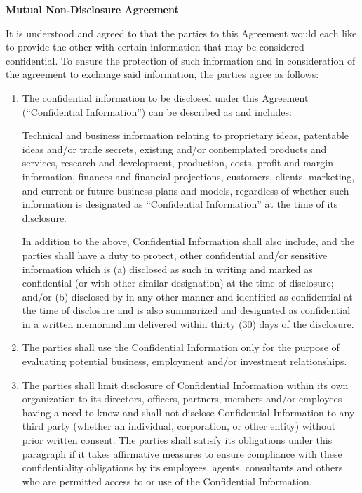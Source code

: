 \documentclass[a4paper, 11pt, twoside]{article}
\begin{document}
\begin{center}
\bf{Mutual Non-Disclosure Agreement}
\end{center}

It is understood and agreed to that the parties to this Agreement would each like to provide the other with certain information that may be considered confidential. To ensure the protection of such information and in consideration of the agreement to exchange said information, the parties agree as follows:

\begin{enumerate}

\item The confidential information to be disclosed under this Agreement (``Confidential Information'') can be described as and includes:

Technical and business information relating to proprietary ideas, patentable ideas and/or trade secrets, existing and/or contemplated products and services, research and development, production, costs, profit and margin information, finances and financial projections, customers, clients, marketing, and current or future business plans and models, regardless of whether such information is designated as ``Confidential Information'' at the time of its disclosure.

In addition to the above, Confidential Information shall also include, and the parties shall have a duty to protect, other confidential and/or sensitive information which is (a) disclosed as such in writing and marked as confidential (or with other similar designation) at the time of disclosure; and/or (b) disclosed by in any other manner and identified as confidential at the time of disclosure and is also summarized and designated as confidential in a written memorandum delivered within thirty (30) days of the disclosure.

\item The parties shall use the Confidential Information only for the purpose of evaluating potential business, employment and/or investment relationships.

\item The parties shall limit disclosure of Confidential Information within its own organization to its directors, officers, partners, members and/or employees having a need to know and shall not disclose Confidential Information to any third party (whether an individual, corporation, or other entity) without prior written consent. The parties shall satisfy its obligations under this paragraph if it takes affirmative measures to ensure compliance with these confidentiality obligations by its employees, agents, consultants and others who are permitted access to or use of the Confidential Information.


\end{enumerate}
\end{document}
